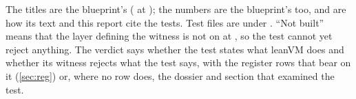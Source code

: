 \label{sec:gen-acceptance-tests}

\begin{sloppypar}
The titles are the blueprint's ( at ); the
numbers are the blueprint's too, and are how its text and this report cite the tests. Test
files are under . \enquote{Not
built} means that the layer defining the witness is not on  at , so the
test cannot yet reject anything. The verdict says whether the test states what leanVM does and
whether its witness rejects what the test says, with the register rows that bear on it
(\cref{sec:reg}) or, where no row does, the dossier and section that examined the test.
\end{sloppypar}

